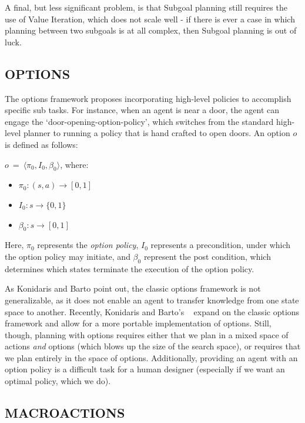 \documentclass[]{article}
\begin{document}
A final, but less significant problem, is that Subgoal planning still requires the use of Value Iteration, which does not scale well - if there is ever a case in which planning between two subgoals is at all complex, then Subgoal planning is out of luck.

\subsection{OPTIONS}

The options framework proposes incorporating high-level policies to accomplish specific sub tasks. For instance, when an agent is near a door, the agent can engage the `door-opening-option-policy', which switches from the standard high-level planner to running a policy that is hand crafted to open doors. An option $o$ is defined as follows:

$o\ =\ \langle \pi_0, I_0, \beta_0\rangle$, where:

\begin{itemize}
\item[] $\pi_0 : (s,a) \rightarrow [0,1]$
\item[] $I_0 : s \rightarrow \{0,1\}$
\item[] $\beta_0 : s \rightarrow [0,1]$
\end{itemize}

Here, $\pi_0$ represents the {\it option policy}, $I_0$ represents a precondition, under which the option policy may initiate, and $\beta_0$ represent the post condition, which determines which states terminate the execution of the option policy.

As Konidaris and Barto point out, the classic options framework is not generalizable, as it does not enable an agent to transfer knowledge from one state space to another. Recently, Konidaris and Barto's ~\citep{konidaris} expand on the classic options framework and allow for a more portable implementation of options. Still, though, planning with options requires either that we plan in a mixed space of actions {\it and} options (which blows up the size of the search space), or requires that we plan entirely in the space of options. Additionally, providing an agent with an option policy is a difficult task for a human designer (especially if we want an optimal policy, which we do).

\subsection{MACROACTIONS}
\end{document}
